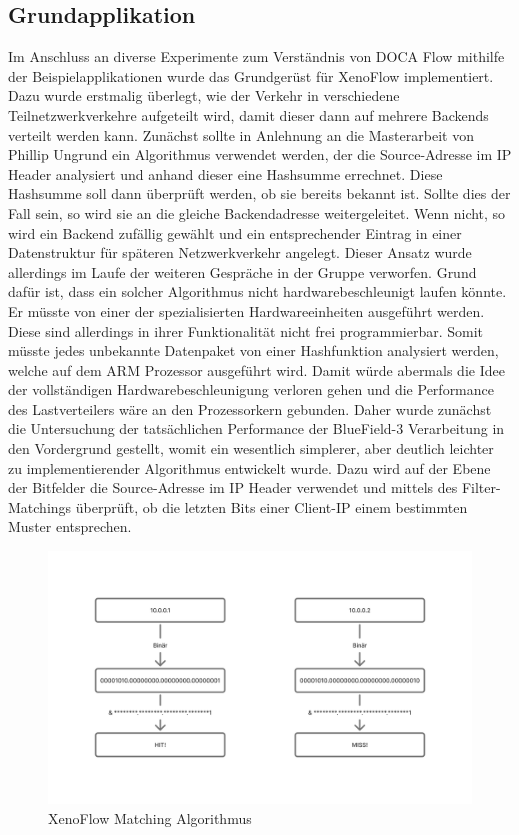 \subsection{Grundapplikation}
Im Anschluss an diverse Experimente zum Verständnis von DOCA Flow mithilfe der Beispielapplikationen wurde das Grundgerüst für XenoFlow implementiert. Dazu wurde erstmalig überlegt, wie der Verkehr in verschiedene Teilnetzwerkverkehre aufgeteilt wird, damit dieser dann auf mehrere Backends verteilt werden kann. Zunächst sollte in Anlehnung an die Masterarbeit von Phillip Ungrund ein Algorithmus verwendet werden, der die Source-Adresse im IP Header analysiert und anhand dieser eine Hashsumme errechnet. Diese Hashsumme soll dann überprüft werden, ob sie bereits bekannt ist. Sollte dies der Fall sein, so wird sie an die gleiche Backendadresse weitergeleitet. Wenn nicht, so wird ein Backend zufällig gewählt und ein entsprechender Eintrag in einer Datenstruktur für späteren Netzwerkverkehr angelegt. Dieser Ansatz wurde allerdings im Laufe der weiteren Gespräche in der Gruppe verworfen. Grund dafür ist, dass ein solcher Algorithmus nicht hardwarebeschleunigt laufen könnte. Er müsste von einer der spezialisierten Hardwareeinheiten ausgeführt werden. Diese sind allerdings in ihrer Funktionalität nicht frei programmierbar. Somit müsste jedes unbekannte Datenpaket von einer Hashfunktion analysiert werden, welche auf dem ARM Prozessor ausgeführt wird. Damit würde abermals die Idee der vollständigen Hardwarebeschleunigung verloren gehen und die Performance des Lastverteilers wäre an den Prozessorkern gebunden. Daher wurde zunächst die Untersuchung der tatsächlichen Performance der BlueField-3 Verarbeitung in den Vordergrund gestellt, womit ein wesentlich simplerer, aber deutlich leichter zu implementierender Algorithmus entwickelt wurde. Dazu wird auf der Ebene der Bitfelder die Source-Adresse im IP Header verwendet und mittels des Filter-Matchings überprüft, ob die letzten Bits einer Client-IP einem bestimmten Muster entsprechen.
\begin{figure}
    \centering
    \includegraphics[width=1.1\linewidth]{images/Filter Matching.png}
    \caption{XenoFlow Matching Algorithmus}
    \label{fig:enter-label}
\end{figure}
